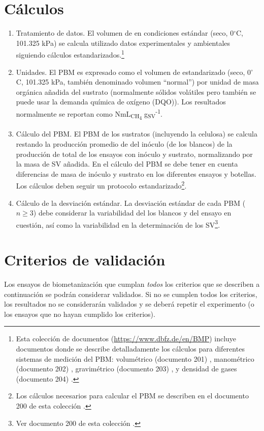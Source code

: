 \documentclass[]{article}
\begin{document}
\section{Cálculos}
\label{sec:calculations}
\begin{enumerate}
  \item Tratamiento de datos.
    El volumen de  en condiciones estándar (seco, 0$^\circ$C, 101.325 kPa) se calcula utilizado datos experimentales y ambientales siguiendo cálculos estandarizados.\footnote{
      Esta colección de documentos (\url{https://www.dbfz.de/en/BMP}) incluye documentos donde se describe detalladamente los cálculos para diferentes sistemas de medición del PBM: volumétrico (documento 201) \citep{BMPdoc201vol}, manométrico (documento 202) \citep{BMPdoc202man}, gravimétrico (documento 203) \citep{BMPdoc203grav}, y densidad de gases (documento 204) \citep{BMPdoc204gasdens}.
    }
  \item Unidades.
	  El PBM es expresado como el volumen de  estandarizado (seco, 0$^\circ$C, 101.325 kPa, también denominado volumen ``normal'') por unidad de masa orgánica añadida del sustrato (normalmente sólidos volátiles pero también se puede usar la demanda química de oxígeno (DQO)). Los resultados normalmente se reportan como NmL\textsubscript{CH\textsubscript{4}} g\textsubscript{SV}\textsuperscript{-1}. 
  \item Cálculo del PBM.
    El PBM de los sustratos (incluyendo la celulosa) se calcula restando la producción promedio de  del inóculo (de los blancos) de la producción de  total de los ensayos con inóculo y sustrato, normalizando por la masa de SV añadida. En el cálculo del PBM se debe tener en cuenta diferencias de masa de inóculo y sustrato en los diferentes ensayos y botellas.
    Los cálculos deben seguir un protocolo estandarizado\footnote{
      Los cálculos necesarios para calcular el PBM se describen en el documento  200 de esta colección \citep{BMPdoc200BMP}.
    }.
  \item Cálculo de la desviación estándar.
    La desviación estándar de cada PBM ($n \ge 3$) debe considerar la variabilidad del los blancos y del ensayo en cuestión, así como la variabilidad en la determinación de los SV\footnote{
      Ver documento 200 de esta colección \citep{BMPdoc200BMP}. 
    }.
\end{enumerate}

\section{Criterios de validación}
\label{sec:crit}
Los ensayos de biometanización que cumplan \textit{todos} los criterios que se describen a continuación se podrán considerar validados.
Si no se cumplen todos los criterios, los resultados no se considerarán validados y se deberá repetir el experimento (o los ensayos que no hayan cumplido los criterios).
\end{document}
